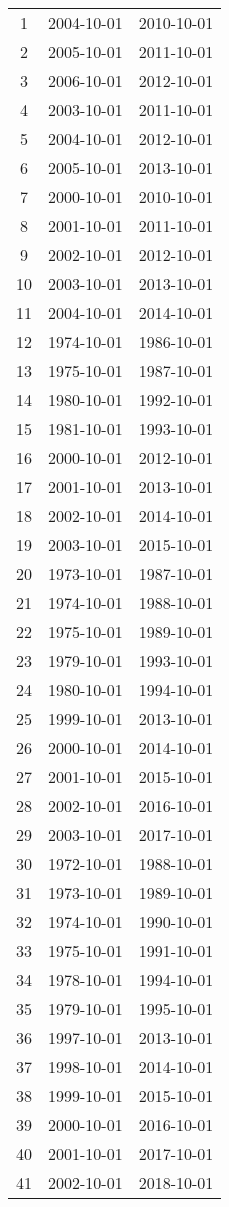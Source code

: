 % 
\begin{tabular}{ccc}
  \hline
  \hline
1 & 2004-10-01 & 2010-10-01 \\ 
  2 & 2005-10-01 & 2011-10-01 \\ 
  3 & 2006-10-01 & 2012-10-01 \\ 
  4 & 2003-10-01 & 2011-10-01 \\ 
  5 & 2004-10-01 & 2012-10-01 \\ 
  6 & 2005-10-01 & 2013-10-01 \\ 
  7 & 2000-10-01 & 2010-10-01 \\ 
  8 & 2001-10-01 & 2011-10-01 \\ 
  9 & 2002-10-01 & 2012-10-01 \\ 
  10 & 2003-10-01 & 2013-10-01 \\ 
  11 & 2004-10-01 & 2014-10-01 \\ 
  12 & 1974-10-01 & 1986-10-01 \\ 
  13 & 1975-10-01 & 1987-10-01 \\ 
  14 & 1980-10-01 & 1992-10-01 \\ 
  15 & 1981-10-01 & 1993-10-01 \\ 
  16 & 2000-10-01 & 2012-10-01 \\ 
  17 & 2001-10-01 & 2013-10-01 \\ 
  18 & 2002-10-01 & 2014-10-01 \\ 
  19 & 2003-10-01 & 2015-10-01 \\ 
  20 & 1973-10-01 & 1987-10-01 \\ 
  21 & 1974-10-01 & 1988-10-01 \\ 
  22 & 1975-10-01 & 1989-10-01 \\ 
  23 & 1979-10-01 & 1993-10-01 \\ 
  24 & 1980-10-01 & 1994-10-01 \\ 
  25 & 1999-10-01 & 2013-10-01 \\ 
  26 & 2000-10-01 & 2014-10-01 \\ 
  27 & 2001-10-01 & 2015-10-01 \\ 
  28 & 2002-10-01 & 2016-10-01 \\ 
  29 & 2003-10-01 & 2017-10-01 \\ 
  30 & 1972-10-01 & 1988-10-01 \\ 
  31 & 1973-10-01 & 1989-10-01 \\ 
  32 & 1974-10-01 & 1990-10-01 \\ 
  33 & 1975-10-01 & 1991-10-01 \\ 
  34 & 1978-10-01 & 1994-10-01 \\ 
  35 & 1979-10-01 & 1995-10-01 \\ 
  36 & 1997-10-01 & 2013-10-01 \\ 
  37 & 1998-10-01 & 2014-10-01 \\ 
  38 & 1999-10-01 & 2015-10-01 \\ 
  39 & 2000-10-01 & 2016-10-01 \\ 
  40 & 2001-10-01 & 2017-10-01 \\ 
  41 & 2002-10-01 & 2018-10-01 \\ 
   \hline
\end{tabular}
